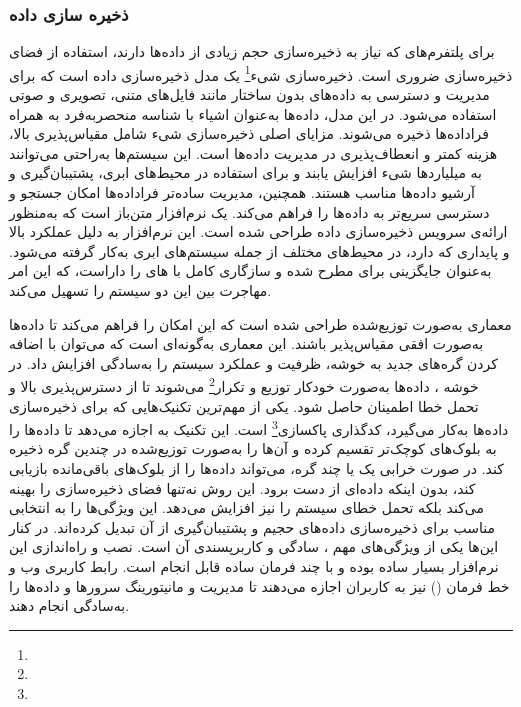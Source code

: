 \subsubsection{ذخیره سازی داده}
برای پلتفرم‌های  که نیاز به ذخیره‌سازی حجم زیادی از داده‌ها دارند، استفاده از فضای ذخیره‌سازی ضروری است. ذخیره‌سازی شیء\footnote{} یک مدل ذخیره‌سازی داده‌ است که برای مدیریت و دسترسی به داده‌های بدون ساختار مانند فایل‌های متنی، تصویری و صوتی استفاده می‌شود. در این مدل، داده‌ها به‌عنوان اشیاء با شناسه منحصربه‌فرد به همراه فراداده‌ها ذخیره می‌شوند. مزایای اصلی ذخیره‌سازی شیء شامل مقیاس‌پذیری بالا، هزینه کمتر و انعطاف‌پذیری در مدیریت داده‌ها است. این سیستم‌ها به‌راحتی می‌توانند به میلیاردها شیء افزایش یابند و برای استفاده در محیط‌های ابری، پشتیبان‌گیری و آرشیو داده‌ها مناسب هستند. همچنین، مدیریت ساده‌تر فراداده‌ها امکان جستجو و دسترسی سریع‌تر به داده‌ها را فراهم می‌کند.  \cite{MinIO} یک نرم‌افزار متن‌باز است که به‌منظور ارائه‌ی سرویس ذخیره‌سازی داده طراحی شده است. این نرم‌افزار به دلیل عملکرد بالا و پایداری که دارد، در محیط‌های مختلف از جمله سیستم‌های ابری به‌کار گرفته می‌شود.  به‌عنوان جایگزینی برای  مطرح شده و سازگاری کامل با های  را داراست، که این امر مهاجرت بین این دو سیستم را تسهیل می‌کند.

معماری  به‌صورت توزیع‌شده طراحی شده است که این امکان را فراهم می‌کند تا داده‌ها به‌صورت افقی مقیاس‌پذیر باشند. این معماری به‌گونه‌ای است که می‌توان با اضافه کردن گره‌های جدید به خوشه، ظرفیت و عملکرد سیستم را به‌سادگی افزایش داد. در خوشه ، داده‌ها به‌صورت خودکار توزیع و تکرار\footnote{} می‌شوند تا از دسترس‌پذیری بالا و تحمل خطا اطمینان حاصل شود. یکی از مهم‌ترین تکنیک‌هایی که  برای ذخیره‌سازی داده‌ها به‌کار می‌گیرد، کدگذاری پاکسازی\footnote{} است. این تکنیک به  اجازه می‌دهد تا داده‌ها را به بلوک‌های کوچک‌تر تقسیم کرده و آن‌ها را به‌صورت توزیع‌شده در چندین گره ذخیره کند. در صورت خرابی یک یا چند گره،  می‌تواند داده‌ها را از بلوک‌های باقی‌مانده بازیابی کند، بدون اینکه داده‌ای از دست برود. این روش نه‌تنها فضای ذخیره‌سازی را بهینه می‌کند بلکه تحمل خطای سیستم را نیز افزایش می‌دهد. این ویژگی‌ها  را به انتخابی مناسب برای ذخیره‌سازی داده‌های حجیم و پشتیبان‌گیری از آن تبدیل کرده‌اند. در کنار این‌ها یکی از ویژگی‌های مهم ، سادگی و کاربرپسندی آن است. نصب و راه‌اندازی این نرم‌افزار بسیار ساده بوده و با چند فرمان ساده قابل انجام است. رابط کاربری وب و خط فرمان () نیز به کاربران اجازه می‌دهند تا مدیریت و مانیتورینگ سرورها و داده‌ها را به‌سادگی انجام دهند.

